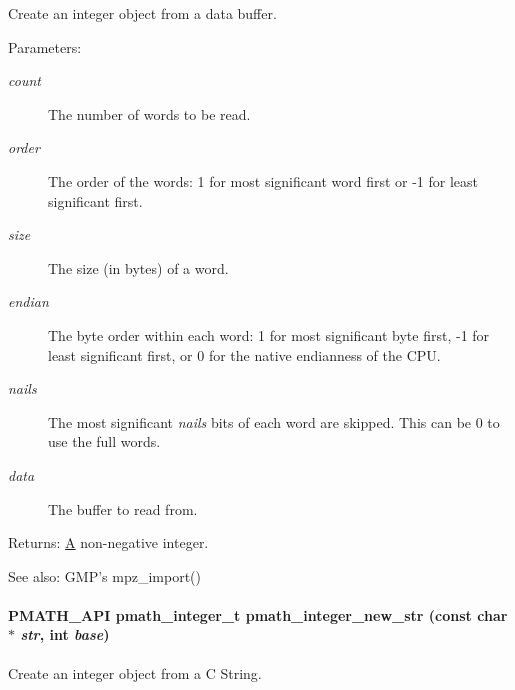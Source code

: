 Create an integer object from a data buffer. 

\begin{Desc}
\item[Parameters:]
\begin{description}
\item[{\em count}]The number of words to be read. \item[{\em order}]The order of the words: 1 for most significant word first or -1 for least significant first. \item[{\em size}]The size (in bytes) of a word. \item[{\em endian}]The byte order within each word: 1 for most significant byte first, -1 for least significant first, or 0 for the native endianness of the CPU. \item[{\em nails}]The most significant {\em nails\/} bits of each word are skipped. This can be 0 to use the full words. \item[{\em data}]The buffer to read from. \end{description}
\end{Desc}
\begin{Desc}
\item[Returns:]\hyperlink{class_a}{A} non-negative integer.\end{Desc}
\begin{Desc}
\item[See also:]GMP's mpz\_\-import() \end{Desc}
\hypertarget{group__numbers_gaca3cb69b051e8f361784f2dc3836fcf}{
\paragraph[{pmath\_\-integer\_\-new\_\-str}]{\setlength{\rightskip}{0pt plus 5cm}PMATH\_\-API {\bf pmath\_\-integer\_\-t} pmath\_\-integer\_\-new\_\-str (const char $\ast$ {\em str}, \/  int {\em base})}\hfill}
\label{group__numbers_gaca3cb69b051e8f361784f2dc3836fcf}


Create an integer object from a C String. 

